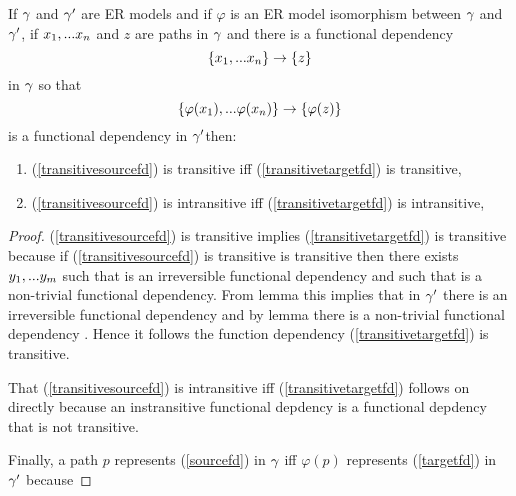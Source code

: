 \begin{lemma}
If $\gamma$ and $\gamma'$ are ER models and  if  $\varphi$ is an ER model isomorphism between $\gamma$  and $\gamma'$,  if $x_1,...x_n$ and $z$ are paths in $\gamma$
and there is a  functional dependency
\begin{equation}
\label{transitivesourcefd}
\left\{x_1,...x_n\right\} \rightarrow \left\{z\right\}
\end{equation} 
in $\gamma$
so that
\begin{equation}
\label{transitivetargetfd}
\left\{\varphi(x_1),...\varphi(x_n)\right\} \rightarrow \left\{\varphi(z)\right\}
\end{equation}
is a functional dependency in $\gamma'$then:
\begin{enumerate}
\item (\ref{transitivesourcefd}) is  transitive iff (\ref{transitivetargetfd}) is transitive, 
\item (\ref{transitivesourcefd}) is  intransitive iff (\ref{transitivetargetfd}) is intransitive,

\end{enumerate}
\end{lemma}
\begin{proof}
\vspace{0.5cm}
(\ref{transitivesourcefd}) is transitive implies (\ref{transitivetargetfd}) 
is transitive because if (\ref{transitivesourcefd}) is transitive is transitive then
there exists $y_1,...y_m$ such that
\mmfd{\xn}{\ym} is an irreversible functional dependency
and such that  is a non-trivial functional dependency.
From lemma  this implies that in $\gamma'$ there is an 
\mmfd{\phixn}{\phiym} irreversible functional dependency \mmfd{\phixn}{\phiym}
and by lemma  there is a non-trivial functional dependency \mmfd{\phiym}{\phiz}. Hence it follows
the function dependency (\ref{transitivetargetfd}) is transitive.

That (\ref{transitivesourcefd}) is  intransitive iff (\ref{transitivetargetfd}) follows on directly because an instransitive functional depdency is a functional depdency that is not transitive.

Finally, a path $p$ represents (\ref{sourcefd}) in $\gamma$ iff $\varphi(p)$ represents (\ref{targetfd}) in $\gamma'$
because

\end{proof}

